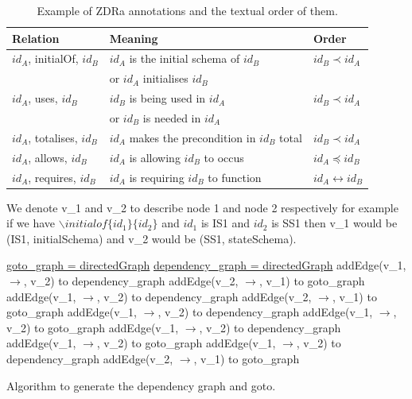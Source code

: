 \begin{table}[H]
\centering
\begin{tabular}{| l | l | l |}
\hline
\textbf{Relation} & \textbf{Meaning} & \textbf{Order} \\
\hline 
$id_{A}$, initialOf, $id_{B}$ & $id_{A}$ is the initial schema of $id_{B}$ & $id_{B} \prec id_{A}$ \\
 & or $id_{A}$ initialises $id_{B}$ & \\
 \hline
$id_{A}$, uses, $id_{B}$ & $id_{B}$ is being used in $id_{A}$ & $id_{B} \prec id_{A}$ \\
& or $id_{B}$ is needed in $id_{A}$ & \\
 \hline
 $id_{A}$, totalises, $id_{B}$ & $id_{A}$ makes the precondition in $id_{B}$ total & $id_{B} \prec id_{A}$ \\
 \hline
$id_{A}$, allows, $id_{B}$ & $id_{A}$ is allowing $id_{B}$ to occus & $id_{A} \preceq id_{B}$ \\
\hline
$id_{A}$, requires, $id_{B}$ & $id_{A}$ is requiring $id_{B}$ to function & $id_{A} \leftrightarrow id_{B}$ \\
\hline
\end{tabular}
\caption{Example of ZDRa annotations and the textual order of them. \label{tab:texorder}}
\end{table}

\begin{defin}
We denote v\_1 and v\_2 to describe node 1 and node 2 respectively for example if we have $\backslash initialof\{id_{1}\}\{id_{2}\}$ and $id_{1}$ is IS1 and $id_{2}$ is SS1 then v\_1 would be (IS1, initialSchema) and v\_2 would be (SS1, stateSchema).
\end{defin}

\begin{algorithm}[H]
\underline{goto\_graph = directedGraph} \;
\underline{dependency\_graph = directedGraph} \;
\SetAlgoLined
{} 
{
addEdge(v\_1, $\rightarrow$, v\_2) to dependency\_graph \;
addEdge(v\_2, $\rightarrow$, v\_1)  to goto\_graph\;
}
{
addEdge(v\_1, $\rightarrow$, v\_2) to dependency\_graph \;
addEdge(v\_2, $\rightarrow$, v\_1)  to goto\_graph \;
}
{
addEdge(v\_1, $\rightarrow$, v\_2) to dependency\_graph \;
addEdge(v\_1, $\rightarrow$, v\_2)  to goto\_graph \;
}
{
addEdge(v\_1, $\rightarrow$, v\_2) to dependency\_graph \;
addEdge(v\_1, $\rightarrow$, v\_2)  to goto\_graph \;
}
{
addEdge(v\_1, $\rightarrow$, v\_2) to dependency\_graph \;
addEdge(v\_2, $\rightarrow$, v\_1)  to goto\_graph \;
}
\caption{Algorithm to generate the dependency graph and goto. \label{alg:gotodep} }
\end{algorithm}
\vspace{0.2in}


